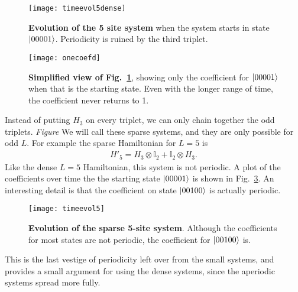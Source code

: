 \begin{figure}
	\centering
	\texttt{[image: timeevol5dense]}
	\caption{\textbf{Evolution of the 5 site system} when the system starts in state $\left|00001\right\rangle$. Periodicity is ruined by the third triplet.}
	\label{fig:timeevol5dense}
\end{figure}

\begin{figure}
	\centering
	\texttt{[image: onecoefd]}
	\caption{\textbf{Simplified view of Fig.~\ref{fig:timeevol5dense}}, showing only the coefficient for $\left|00001\right\rangle$ when that is the starting state. Even with the longer range of time, the coefficient never returns to 1.}
	\label{fig:onecoef}
\end{figure}


Instead of putting $H_3$ on every triplet, we can only chain together the odd triplets. \emph{Figure} We will call these sparse systems, and they are only possible for odd $L$. For example the sparse Hamiltonian for $L=5$ is
\begin{align}
H'_5 = H_3\otimes\mathbb{I}_2 + \mathbb{I}_2\otimes H_3.
\end{align}
Like the dense $L=5$ Hamiltonian, this system is not periodic. A plot of the coefficients over time the the starting state $\left|00001\right\rangle$ is shown in Fig.~\ref{fig:timeevol5}. An interesting detail is that the coefficient on state $\left|00100\right\rangle$ is actually periodic. 
\begin{figure}
	\centering
	\texttt{[image: timeevol5]}
	\caption{\textbf{Evolution of the sparse 5-site system}. Although the coefficients for most states are not periodic, the coefficient for $\left|00100\right\rangle$ is.}
	\label{fig:timeevol5}
\end{figure} 
This is the last vestige of periodicity left over from the small systems, and provides a small argument for using the dense systems, since the aperiodic systems spread more fully.

